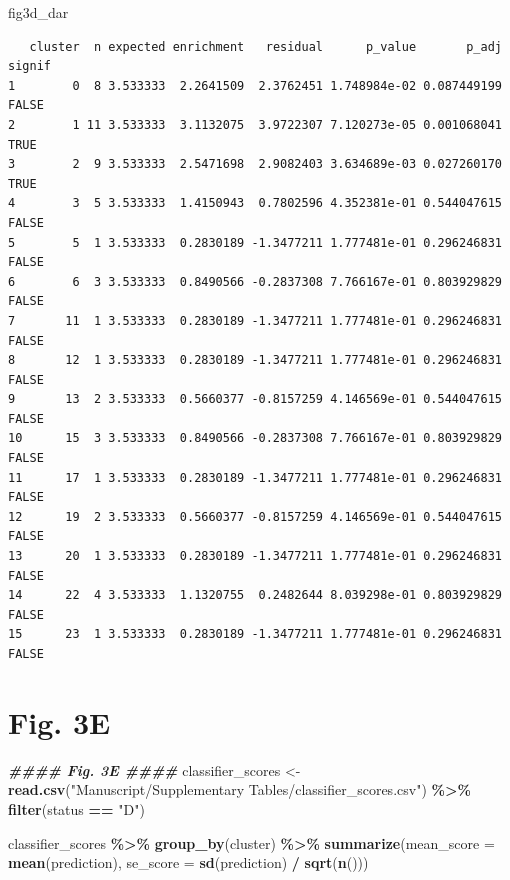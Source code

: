 \documentclass[
  landscape]{article}
\newenvironment{Shaded}{\begin{snugshade}}{\end{snugshade}}
\newcommand{\AttributeTok}[1]{\textcolor[rgb]{0.13,0.29,0.53}{#1}}
\newcommand{\DocumentationTok}[1]{\textcolor[rgb]{0.56,0.35,0.01}{\textbf{\textit{#1}}}}
\newcommand{\FunctionTok}[1]{\textcolor[rgb]{0.13,0.29,0.53}{\textbf{#1}}}
\newcommand{\NormalTok}[1]{#1}
\newcommand{\OtherTok}[1]{\textcolor[rgb]{0.56,0.35,0.01}{#1}}
\newcommand{\SpecialCharTok}[1]{\textcolor[rgb]{0.81,0.36,0.00}{\textbf{#1}}}
\newcommand{\StringTok}[1]{\textcolor[rgb]{0.31,0.60,0.02}{#1}}
\begin{document}
\begin{Shaded}
\begin{Highlighting}[]
\NormalTok{fig3d\_dar}
\end{Highlighting}
\end{Shaded}

\begin{verbatim}
   cluster  n expected enrichment   residual      p_value       p_adj signif
1        0  8 3.533333  2.2641509  2.3762451 1.748984e-02 0.087449199  FALSE
2        1 11 3.533333  3.1132075  3.9722307 7.120273e-05 0.001068041   TRUE
3        2  9 3.533333  2.5471698  2.9082403 3.634689e-03 0.027260170   TRUE
4        3  5 3.533333  1.4150943  0.7802596 4.352381e-01 0.544047615  FALSE
5        5  1 3.533333  0.2830189 -1.3477211 1.777481e-01 0.296246831  FALSE
6        6  3 3.533333  0.8490566 -0.2837308 7.766167e-01 0.803929829  FALSE
7       11  1 3.533333  0.2830189 -1.3477211 1.777481e-01 0.296246831  FALSE
8       12  1 3.533333  0.2830189 -1.3477211 1.777481e-01 0.296246831  FALSE
9       13  2 3.533333  0.5660377 -0.8157259 4.146569e-01 0.544047615  FALSE
10      15  3 3.533333  0.8490566 -0.2837308 7.766167e-01 0.803929829  FALSE
11      17  1 3.533333  0.2830189 -1.3477211 1.777481e-01 0.296246831  FALSE
12      19  2 3.533333  0.5660377 -0.8157259 4.146569e-01 0.544047615  FALSE
13      20  1 3.533333  0.2830189 -1.3477211 1.777481e-01 0.296246831  FALSE
14      22  4 3.533333  1.1320755  0.2482644 8.039298e-01 0.803929829  FALSE
15      23  1 3.533333  0.2830189 -1.3477211 1.777481e-01 0.296246831  FALSE
\end{verbatim}

\section{Fig. 3E}\label{fig.-3e}

\begin{Shaded}
\begin{Highlighting}[]
\DocumentationTok{\#\#\#\# Fig. 3E \#\#\#\#}
\NormalTok{classifier\_scores }\OtherTok{\textless{}{-}} \FunctionTok{read.csv}\NormalTok{(}\StringTok{"Manuscript/Supplementary Tables/classifier\_scores.csv"}\NormalTok{) }\SpecialCharTok{\%\textgreater{}\%}
  \FunctionTok{filter}\NormalTok{(status }\SpecialCharTok{==} \StringTok{"D"}\NormalTok{)}

\NormalTok{classifier\_scores }\SpecialCharTok{\%\textgreater{}\%}
  \FunctionTok{group\_by}\NormalTok{(cluster) }\SpecialCharTok{\%\textgreater{}\%}
  \FunctionTok{summarize}\NormalTok{(}\AttributeTok{mean\_score =} \FunctionTok{mean}\NormalTok{(prediction), }\AttributeTok{se\_score =} \FunctionTok{sd}\NormalTok{(prediction) }\SpecialCharTok{/} \FunctionTok{sqrt}\NormalTok{(}\FunctionTok{n}\NormalTok{()))}
\end{Highlighting}
\end{Shaded}
\end{document}
